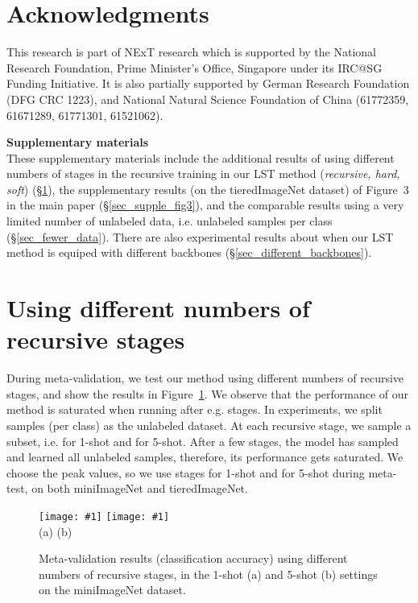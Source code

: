 \documentclass{article}
\begin{document}
\section*{Acknowledgments}
This research is part of NExT research which is supported by the National Research Foundation, Prime Minister's Office, Singapore under its IRC@SG Funding Initiative.
It is also partially supported by German Research Foundation (DFG CRC 1223), and National Natural Science Foundation of China (61772359, 61671289, 61771301, 61521062).




{}


\clearpage



\setcounter{section}{0}
\renewcommand\thesection{\Alph{section}}
\noindent
{\Large {\textbf{Supplementary materials}}}
\\

These supplementary materials include 
the additional results of using different numbers of stages in the recursive training in our LST method (\emph{recursive, hard, soft}) (\S\ref{sec_stages}), 
the supplementary results (on the tieredImageNet dataset) of Figure~3 in the main paper (\S\ref{sec_supple_fig3}),
and the comparable results using a very limited number of unlabeled data, i.e.  unlabeled samples per class (\S\ref{sec_fewer_data}). There are also experimental results about when our LST method is equiped with different backbones (\S\ref{sec_different_backbones}).


\section{Using different numbers of recursive stages}
\label{sec_stages}

During meta-validation, we test our method using different numbers of recursive stages, and show the results in Figure~\ref{figure_diff_recursive_stage}.
We observe that the performance of our method is saturated when running after e.g.  stages. 
In experiments, we split  samples (per class) as the unlabeled dataset.
At each recursive stage, we sample a subset, i.e.  for 1-shot and  for 5-shot. After a few stages, the model has sampled and learned all unlabeled samples, therefore, its performance gets saturated.
We choose the peak values, so we use  stages for 1-shot and  for 5-shot during meta-test, on both miniImageNet and tieredImageNet.


\begin{figure}[h]
\newcommand{\plotexpone}[1]{\texttt{[image: \#1]}}
\plotexpone{supple_figures/figureS1a.eps}
\plotexpone{supple_figures/figureS1b.eps}\\
\hspace*{3.40cm} (a) \hspace{6.70cm}(b) \\
\vspace{-0.2cm}
\caption{Meta-validation results (classification accuracy) using different numbers of recursive stages, in the 1-shot (a) and 5-shot (b) settings on the miniImageNet dataset.}
\label{figure_diff_recursive_stage}
\end{figure} 
\end{document}
